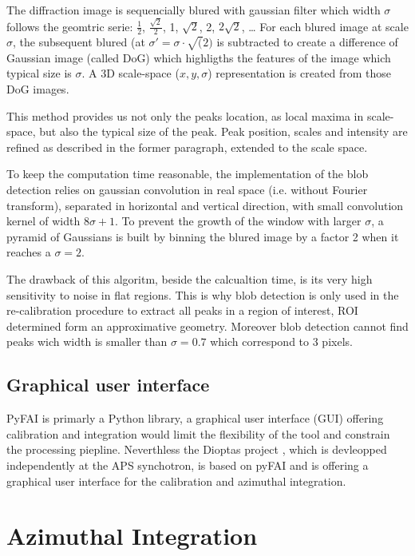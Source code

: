 \documentclass[preprint]{iucr}
\begin{document}
The diffraction image is sequencially blured with gaussian filter which
width $\sigma$ follows the geomtric serie: $\frac{1}{2}$,
$\frac{\sqrt{2}}{2}$, 1, $\sqrt{2}$, 2, $2\sqrt{2}$, \ldots
For each blured image at scale $\sigma$, the subsequent blured (at
$\sigma'=\sigma\cdot\sqrt(2)$
is subtracted to create a difference of Gaussian
image (called DoG) which highligths the features of the image which typical size
is $\sigma$. 
A 3D scale-space ($x,y,\sigma$) representation is created from those DoG images.

This method provides us not only the peaks location, as local maxima in
scale-space, but also the typical size of the peak. 
Peak position, scales and intensity are refined as described in the former
paragraph, extended to the scale space.

To keep the computation time reasonable, the implementation of the blob
detection relies on gaussian convolution in real space (i.e. without Fourier
transform), separated in horizontal and vertical direction, with small
convolution kernel of width $8 \sigma +1$.
To prevent the growth of the window with larger $\sigma$, a pyramid of Gaussians
is built by binning the blured image by a factor 2 when it reaches a $\sigma=2$.

The drawback of this algoritm, beside the calcualtion time, is its very high
sensitivity to noise in flat regions. 
This is why blob detection is only used in the re-calibration procedure to
extract all peaks in a region of interest, ROI determined form an
approximative geometry.
Moreover blob detection cannot find peaks wich width is smaller than  
$\sigma=0.7$ which correspond to 3 pixels.


\subsection{Graphical user interface}
PyFAI is primarly a Python library, a graphical user interface (GUI) offering
calibration and integration would limit the flexibility of the tool and
constrain the processing piepline. 
Neverthless the Dioptas project 
\cite{diopas}, which is devleopped independently at the APS synchotron, is based
on pyFAI and is offering a graphical user interface for the calibration and
azimuthal integration.

\section{Azimuthal Integration}
\end{document}
